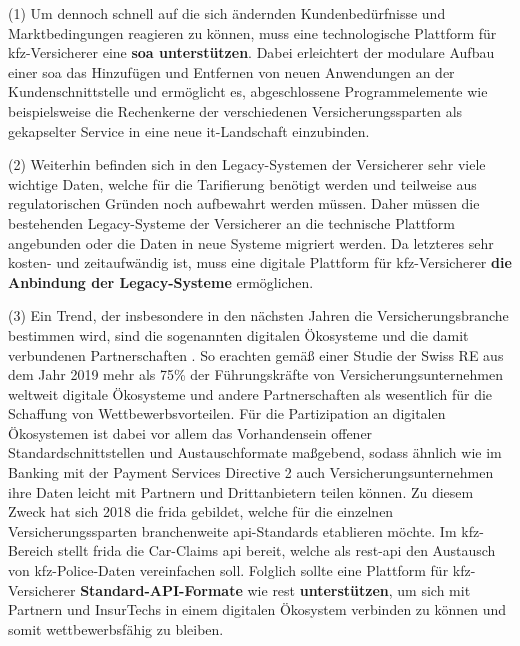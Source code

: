 
(1) Um dennoch schnell auf die sich ändernden Kundenbedürfnisse und Marktbedingungen reagieren zu können, muss eine technologische Plattform für \ac{kfz}-Versicherer eine \textbf{\ac{soa} unterstützen}. Dabei erleichtert der modulare Aufbau einer \ac{soa} das Hinzufügen und Entfernen von neuen Anwendungen an der Kundenschnittstelle \autocite[Vgl.][S. 392]{WARG2016} und ermöglicht es, abgeschlossene Programmelemente wie beispielsweise die Rechenkerne der verschiedenen Versicherungssparten als gekapselter Service in eine neue \ac{it}-Landschaft einzubinden. \autocite[Vgl.][S. 10f]{URLA2019}

(2) Weiterhin befinden sich in den Legacy-Systemen der Versicherer sehr viele wichtige Daten, welche für die Tarifierung benötigt werden und teilweise aus regulatorischen Gründen noch aufbewahrt werden müssen. Daher müssen die bestehenden Legacy-Systeme der Versicherer an die technische Plattform angebunden oder die Daten in neue Systeme migriert werden. Da letzteres sehr kosten- und zeitaufwändig ist, muss eine digitale Plattform für \ac{kfz}-Versicherer \textbf{die Anbindung der Legacy-Systeme} ermöglichen. \autocite[Vgl.][S. 10-12]{GUNTER2020}

(3) Ein Trend, der insbesondere in den nächsten Jahren die Versicherungsbranche bestimmen wird, sind die sogenannten digitalen Ökosysteme und die damit verbundenen Partnerschaften \autocite[Vgl.][]{AVRAMAKIS2023}. So erachten gemäß einer Studie der Swiss RE aus dem Jahr 2019 mehr als 75\% der Führungskräfte von Versicherungsunternehmen weltweit digitale Ökosysteme und andere Partnerschaften als wesentlich für die Schaffung von Wettbewerbsvorteilen. \autocite[Vgl.][]{PAYNE2022} Für die Partizipation an digitalen Ökosystemen ist dabei vor allem das Vorhandensein offener Standardschnittstellen und Austauschformate maßgebend, sodass ähnlich wie im Banking mit der Payment Services Directive 2 auch Versicherungsunternehmen ihre Daten leicht mit Partnern und Drittanbietern teilen können. Zu diesem Zweck hat sich 2018 die \ac{frida} gebildet, welche für die einzelnen Versicherungssparten branchenweite \ac{api}-Standards etablieren möchte.\autocite[Vgl.][]{2021z} Im \ac{kfz}-Bereich stellt \ac{frida} die Car-Claims \ac{api} bereit, welche als \ac{rest}-\ac{api} den Austausch von \ac{kfz}-Police-Daten vereinfachen soll. Folglich sollte eine Plattform für \ac{kfz}-Versicherer \textbf{Standard-API-Formate} wie \ac{rest} \textbf{unterstützen}, um sich mit Partnern und InsurTechs in einem digitalen Ökosystem verbinden zu können und somit wettbewerbsfähig zu bleiben. \autocite[Vgl.][]{KRETZ2023}

